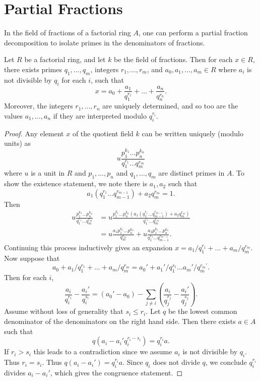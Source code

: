 \section{Partial Fractions}

In the field of fractions of a factorial ring $A$, one can perform a partial fraction decomposition to isolate primes in the denominators of fractions.

\begin{lemma}
    Let $R$ be a factorial ring, and let $k$ be the field of fractions. Then for each $x \in R$, there exists primes $q_1,\dots,q_m$, integers $r_1,\dots,r_m$, and $a_0,a_1,\dots,a_m \in R$ where $a_i$ is not divisible by $q_i$ for each $i$, such that
    \[ x = a_0 + \frac{a_1}{q_1^{r_1}} + \dots + \frac{a_n}{q_n^{r_n}}. \]
    Moreover, the integers $r_1,\dots,r_n$ are uniquely determined, and so too are the values $a_1,\dots,a_n$ if they are interpreted modulo $q_i^{r_i}$.
\end{lemma}
\begin{proof}
    Any element $x$ of the quotient field $k$ can be written uniquely (modulo units) as
    \[ u \frac{p_1^{k_1} \dots p_n^{k_n}}{q_1^{r_1} \dots q_m^{r_m}} \]
    where $u$ is a unit in $R$ and $p_1,\dots,p_n$ and $q_1,\dots,q_m$ are distinct primes in $A$. To show the existence statement, we note there is $a_1,a_2$ such that
    \[ a_1(q_1^{r_1} \dots q_{m-1}^{r_{m-1}}) + a_2q_m^{r_m} = 1. \]
    Then
    \begin{align*}
        u \frac{p_1^{k_1} \dots p_n^{k_n}}{q_1^{r_1} \dots q_m^{r_m}} &= u \frac{p_1^{k_1} \dots p_n^{k_n}(a_1(q_1^{r_1} \dots q_{m-1}^{r_{m-1}}) + a_2q_m^{r_m})}{q_1^{r_1} \dots q_m^{r_m}}\\
        &= u \frac{a_1 p_1^{k_1} \dots p_n^{k_n}}{q_m^{r_m}} + u \frac{a_2 p_1^{k_1} \dots p_n^{k_n}}{q_1^{r_1} \dots q_{m-1}^{r_{m-1}}}.
    \end{align*}
    Continuing this process inductively gives an expansion $x = a_1/q_1^{r_1} + \dots + a_m/q_m^{r_m}$. Now suppose that
    \[ a_0 + a_1/q_1^{r_1} + \dots + a_m/q_m^{r_m} = a_0' + a_1'/q_1^{s_1} \dots a_m'/q_m^{r_m'}. \]
    Then for each $i$,
    \[ \frac{a_i}{q_i^{r_i}} - \frac{a_i'}{q_i^{s_i}} = (a_0' - a_0) - \sum_{j \neq i} \left( \frac{a_i}{q_j^{r_j}} - \frac{a_i'}{q_j^{s_j}} \right). \]
    Assume without loss of generality that $s_i \leq r_i$. Let $q$ be the lowest common denominator of the denominators on the right hand side. Then there exists $a \in A$ such that
    \[ q(a_i - a_i' q_i^{r_i - s_i})  = q_i^{r_i} a. \]
    If $r_i > s_i$ this leads to a contradiction since we assume $a_i$ is not divisible by $q_i$. Thus $r_i = s_i$. Thus $q(a_i - a_i') = q_i^{r_i} a$. Since $q_i$ does not divide $q$, we conclude $q_i^{r_i}$ divides $a_i - a_i'$, which gives the congruence statement.
\end{proof}

